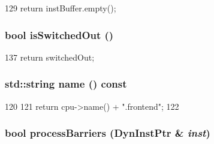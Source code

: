 \begin{DoxyCode}
129 { return instBuffer.empty(); }
\end{DoxyCode}
\hypertarget{classFrontEnd_a471165257f311a78136ce991a3bad31a}{
\subsubsection[{isSwitchedOut}]{\setlength{\rightskip}{0pt plus 5cm}bool isSwitchedOut ()}}
\label{classFrontEnd_a471165257f311a78136ce991a3bad31a}



\begin{DoxyCode}
137 { return switchedOut; }
\end{DoxyCode}
\hypertarget{classFrontEnd_a37627d5d5bba7f4a8690c71c2ab3cb07}{
\subsubsection[{name}]{\setlength{\rightskip}{0pt plus 5cm}std::string name () const}}
\label{classFrontEnd_a37627d5d5bba7f4a8690c71c2ab3cb07}



\begin{DoxyCode}
120 {
121     return cpu->name() + ".frontend";
122 }
\end{DoxyCode}
\hypertarget{classFrontEnd_a71821f0ab4ae4fb1fa4ce667e2d6d8d9}{
\subsubsection[{processBarriers}]{\setlength{\rightskip}{0pt plus 5cm}bool processBarriers ({\bf DynInstPtr} \& {\em inst})}}
\label{classFrontEnd_a71821f0ab4ae4fb1fa4ce667e2d6d8d9}



